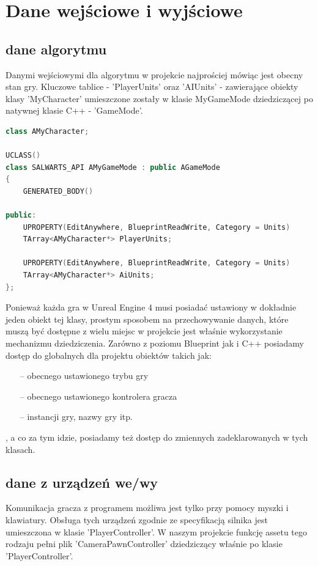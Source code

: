 \documentclass[12pt]{report}
\begin{document}
\section{Dane wejściowe i wyjściowe}
\subsection{dane algorytmu}
Danymi wejściowymi dla algorytmu w projekcie najprościej mówiąc jest obecny stan gry. Kluczowe tablice - 'PlayerUnits' oraz 'AIUnits' - zawierające obiekty klasy 'MyCharacter' umieszczone zostały w klasie MyGameMode dziedziczącej po natywnej klasie C++ - 'GameMode'. 

\begin{lstlisting}[language=C++, backgroundcolor=\color{black!5}, basicstyle=\footnotesize, caption=Klasa AMyGameMode.h.]
   class AMyCharacter;

UCLASS()
class SALWARTS_API AMyGameMode : public AGameMode
{
	GENERATED_BODY()

public:
	UPROPERTY(EditAnywhere, BlueprintReadWrite, Category = Units)
	TArray<AMyCharacter*> PlayerUnits;

	UPROPERTY(EditAnywhere, BlueprintReadWrite, Category = Units)
	TArray<AMyCharacter*> AiUnits;
};
\end{lstlisting}



Ponieważ każda gra w Unreal Engine 4 musi posiadać ustawiony w dokładnie jeden obiekt tej klasy, prostym sposobem na przechowywanie danych, które muszą być dostępne z wielu miejsc w projekcie jest właśnie wykorzystanie mechanizmu dziedziczenia. Zarówno z poziomu Blueprint jak i C++ posiadamy dostęp do globalnych dla projektu obiektów takich jak: 
\begin{itemize}
\item[--] obecnego ustawionego trybu gry
\item[--] obecnego ustawionego kontrolera gracza
\item[--] instancji gry, nazwy gry itp.
\end{itemize}
, a co za tym idzie, posiadamy też dostęp do zmiennych zadeklarowanych w tych klasach.
\subsection{dane z urządzeń we/wy}
Komunikacja gracza z programem możliwa jest tylko przy pomocy myszki i klawiatury. Obsługa tych urządzeń zgodnie ze specyfikacją silnika jest umieszczona w klasie 'PlayerController'. W naszym projekcie funkcję assetu tego rodzaju pełni plik 'CameraPawnController' dziedziczący właśnie po klasie 'PlayerController'.
\end{document}
